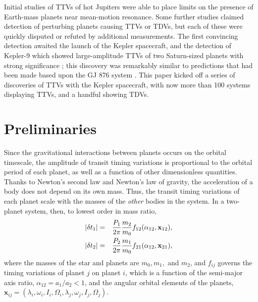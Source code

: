 \documentclass[graybox,natbib,nosecnum]{svmult}
\begin{document}
Initial studies of TTVs of hot Jupiters were able to place limits on the presence of Earth-mass planets near mean-motion resonance.  Some further studies claimed detection of perturbing planets causing TTVs or TDVs, but each of these were quickly disputed or refuted by additional measurements.  The first convincing detection awaited the launch of the Kepler spacecraft, and the detection of Kepler-9 which showed large-amplitude TTVs of two Saturn-sized planets with strong significance \citep{2010Sci...330...51H}; this discovery was remarkably similar to predictions that had been made based upon the GJ 876 system \citep{2005MNRAS.359..567A}.  This paper kicked off a series of discoveries of TTVs with the Kepler spacecraft, with now more than 100 systems displaying TTVs, and a handful showing TDVs.


\section{Preliminaries}

Since the gravitational interactions between planets occurs on the orbital timescale, the
amplitude of transit timing variations is proportional to the orbital period of each planet,
as well as a function of other dimensionless quantities.  Thanks to Newton's second law
and Newton's law of gravity, the acceleration of a body does not depend on its own mass.
Thus, the transit timing variations of each planet scale with the masses of the {\it other} bodies
in the system.
In a two-planet system, then, to lowest order in mass ratio,
\begin{eqnarray}
\vert \delta t_1\vert &=& \frac{P_1}{2\pi} \frac{m_2}{m_0} f_{12}(\alpha_{12},\mathbf{x}_{12}),\cr
\vert \delta t_2\vert &=& \frac{P_2}{2\pi} \frac{m_1}{m_0} f_{21}(\alpha_{12},\mathbf{x}_{21}),
\end{eqnarray}
where the masses of the star and planets are $m_0, m_1,$ and $m_2$, and $f_{ij}$ governs
the timing variations of planet $j$ on planet $i$,
which is a function of the semi-major axis ratio, $\alpha_{12}= a_1/a_2 < 1$, and the angular orbital 
elements of the planets, $\mathbf{x}_{ij} = (\lambda_i,\omega_i,I_i,\Omega_i,\lambda_j,\omega_j,I_j,\Omega_j)$.
\end{document}
